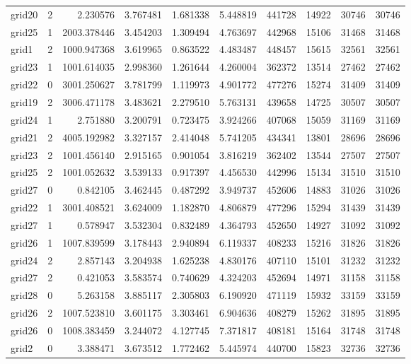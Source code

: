 \begin{longtable}{|l|r|r|r|r|r|r|r|r|r|}
grid20 & 2 & 2.230576 & 3.767481 & 1.681338 & 5.448819 & 441728 & 14922 & 30746 & 30746 \\
grid25 & 1 & 2003.378446 & 3.454203 & 1.309494 & 4.763697 & 442968 & 15106 & 31468 & 31468 \\
grid1 & 2 & 1000.947368 & 3.619965 & 0.863522 & 4.483487 & 448457 & 15615 & 32561 & 32561 \\
grid23 & 1 & 1001.614035 & 2.998360 & 1.261644 & 4.260004 & 362372 & 13514 & 27462 & 27462 \\
grid22 & 0 & 3001.250627 & 3.781799 & 1.119973 & 4.901772 & 477276 & 15274 & 31409 & 31409 \\
grid19 & 2 & 3006.471178 & 3.483621 & 2.279510 & 5.763131 & 439658 & 14725 & 30507 & 30507 \\
grid24 & 1 & 2.751880 & 3.200791 & 0.723475 & 3.924266 & 407068 & 15059 & 31169 & 31169 \\
grid21 & 2 & 4005.192982 & 3.327157 & 2.414048 & 5.741205 & 434341 & 13801 & 28696 & 28696 \\
grid23 & 2 & 1001.456140 & 2.915165 & 0.901054 & 3.816219 & 362402 & 13544 & 27507 & 27507 \\
grid25 & 2 & 1001.052632 & 3.539133 & 0.917397 & 4.456530 & 442996 & 15134 & 31510 & 31510 \\
grid27 & 0 & 0.842105 & 3.462445 & 0.487292 & 3.949737 & 452606 & 14883 & 31026 & 31026 \\
grid22 & 1 & 3001.408521 & 3.624009 & 1.182870 & 4.806879 & 477296 & 15294 & 31439 & 31439 \\
grid27 & 1 & 0.578947 & 3.532304 & 0.832489 & 4.364793 & 452650 & 14927 & 31092 & 31092 \\
grid26 & 1 & 1007.839599 & 3.178443 & 2.940894 & 6.119337 & 408233 & 15216 & 31826 & 31826 \\
grid24 & 2 & 2.857143 & 3.204938 & 1.625238 & 4.830176 & 407110 & 15101 & 31232 & 31232 \\
grid27 & 2 & 0.421053 & 3.583574 & 0.740629 & 4.324203 & 452694 & 14971 & 31158 & 31158 \\
grid28 & 0 & 5.263158 & 3.885117 & 2.305803 & 6.190920 & 471119 & 15932 & 33159 & 33159 \\
grid26 & 2 & 1007.523810 & 3.601175 & 3.303461 & 6.904636 & 408279 & 15262 & 31895 & 31895 \\
grid26 & 0 & 1008.383459 & 3.244072 & 4.127745 & 7.371817 & 408181 & 15164 & 31748 & 31748 \\
grid2 & 0 & 3.388471 & 3.673512 & 1.772462 & 5.445974 & 440700 & 15823 & 32736 & 32736 \\

\end{longtable}
